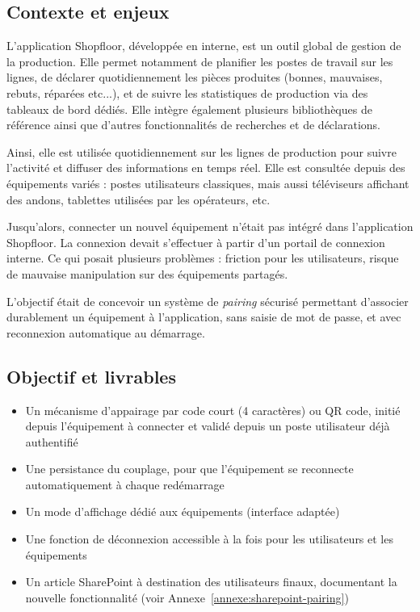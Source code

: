 \documentclass[pe1a]{tnreport} %
\begin{document}
\subsection{Contexte et enjeux}
L'application Shopfloor, développée en interne, est un outil global de 
gestion de la production. Elle permet notamment de planifier les postes 
de travail sur les lignes, de déclarer quotidiennement les pièces 
produites (bonnes, mauvaises, rebuts, réparées etc...), et de suivre les statistiques de 
production via des tableaux de bord dédiés. Elle intègre également 
plusieurs bibliothèques de référence ainsi que d'autres fonctionnalités de 
recherches et de déclarations.

Ainsi, elle est utilisée quotidiennement 
sur les lignes de production pour suivre l'activité et diffuser des 
informations en temps réel. Elle est consultée depuis des équipements variés : 
postes utilisateurs classiques, mais aussi téléviseurs affichant des \gls{andons}, 
tablettes utilisées par les opérateurs, etc.

Jusqu'alors, connecter un nouvel équipement n'était pas intégré dans l'application Shopfloor. 
La connexion devait s'effectuer à partir d'un portail de connexion interne. Ce qui posait plusieurs 
problèmes : friction pour les utilisateurs, risque de mauvaise manipulation 
sur des équipements partagés.

L'objectif était de concevoir un système de \textit{pairing} sécurisé 
permettant d'associer durablement un équipement à l'application, sans saisie 
de mot de passe, et avec reconnexion automatique au démarrage.

\subsection{Objectif et livrables}
\begin{itemize}
    \item Un mécanisme d'appairage par code court (4 caractères) ou QR code, 
    initié depuis l'équipement à connecter et validé depuis un poste 
    utilisateur déjà authentifié
    \item Une persistance du couplage, pour que l'équipement se reconnecte 
    automatiquement à chaque redémarrage
    \item Un mode d'affichage dédié aux équipements (interface adaptée)
    \item Une fonction de déconnexion accessible à la fois pour les 
    utilisateurs et les équipements
    \item Un article SharePoint à destination des utilisateurs finaux, 
    documentant la nouvelle fonctionnalité (voir Annexe~\ref{annexe:sharepoint-pairing})
\end{itemize}
\end{document}
